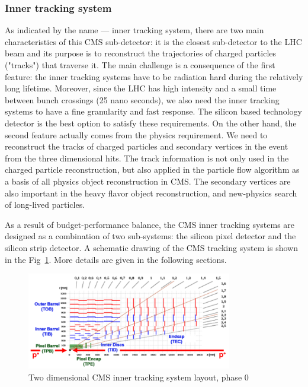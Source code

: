 \subsubsection{Inner tracking system}

As indicated by the name --- inner tracking system, there are two main characteristics of this CMS sub-detector: it is the closest sub-detector to the LHC beam and its purpose is to reconstruct the trajectories of charged particles ("tracks") that traverse it. The main challenge is a consequence of the first feature: the inner tracking systems have to be radiation hard during the relatively long lifetime. Moreover, since the LHC has high intensity and a small time between bunch crossings (25 nano seconds), we also need the inner tracking systems to have a fine granularity and fast response. The silicon based technology detector is the best option to satisfy these requirements. On the other hand, the second feature actually comes from the physics requirement. We need to reconstruct the tracks of charged particles and secondary vertices in the event from the three dimensional hits. The track information is not only used in the charged particle reconstruction, but also applied in the particle flow algorithm\cite{CMS-PAS-PFT-09-001} as a basis of all physics object reconstruction in CMS. The secondary vertices are also important in the heavy flavor object reconstruction, and new-physics search of long-lived particles. 

As a result of budget-performance balance, the CMS inner tracking systems are designed as a combination of two sub-systems: the silicon pixel detector and the silicon strip detector. A schematic drawing of the CMS tracking system is shown in the Fig~\ref{fig:c3cms2dtracker}. More details are given in the following sections. 

\begin{figure}[htbp]
 \begin{center}
  \includegraphics[width=0.8\textwidth]{figures/c3/c3_cms_2dtracker.png}
 \end{center}
 \caption{Two dimensional CMS inner tracking system layout, phase 0}
 \label{fig:c3cms2dtracker}
\end{figure}

